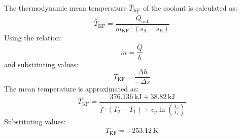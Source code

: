 The thermodynamic mean temperature \( \bar{T}_{\text{KF}} \) of the coolant is calculated as:  
\[
\bar{T}_{\text{KF}} = \frac{\dot{Q}_{\text{out}}}{\dot{m}_{\text{KF}} \cdot (s_{\text{A}} - s_{\text{E}})}
\]  
Using the relation:  
\[
\dot{m} = \frac{\dot{Q}}{h}
\]  
and substituting values:  
\[
\bar{T}_{\text{KF}} = \frac{\Delta h}{-\Delta s}
\]  
The mean temperature is approximated as:  
\[
\bar{T}_{\text{KF}} = \frac{376.136 \, \text{kJ} + 38.82 \, \text{kJ}}{f \cdot (T_2 - T_1) + c_p \ln \left( \frac{T_2}{T_1} \right)}
\]  
Substituting values:  
\[
\bar{T}_{\text{KF}} = -253.12 \, \text{K}
\]